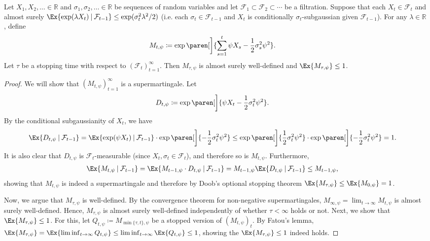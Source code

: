 \documentclass{article}
\newcommand{\defeq}{\coloneq}
\newcommand{\Real}{\mathds{R}}
\newcommand\given[1][\delimsize]{%
  \providecommand{\delimsize}{}
  \nonscript\:#1\vert\allowbreak\nonscript\:\mathopen{}
}
\DeclarePairedDelimiter{\paren}()
\begin{document}
\begin{lemma}\label{lemma:martingale-mgf}
  Let $X_1, X_2, \dotsc \in \Real$ and
  $\sigma_1, \sigma_2, \dotsc \in \Real$ be sequences of random
  variables and let
  $\mathcal{F}_1 \subset \mathcal{F}_2 \subset \dotsb$ be a
  filtration.  Suppose that each $X_t \in \mathcal{F}_t$ and almost
  surely
  $\Ex{\exp(\lambda X_t)\given \mathcal{F}_{t-1}} \le
  \exp(\sigma_t^2\lambda^2/2)$ (i.e. each
  $\sigma_t \in \mathcal{F}_{t-1}$ and $X_t$ is conditionally
  $\sigma_t$-subgaussian given $\mathcal{F}_{t-1}$).  For any
  $\lambda\in\Real$, define
  \begin{align*}
    M_{t,\psi} &\defeq \exp\paren[\bigg]{\sum_{s=1}^t \psi X_s - \frac{1}{2}\sigma_s^2\psi^2}.
  \end{align*}
  Let $\tau$ be a stopping time with respect to
  ${(\mathcal{F}_t)}_{t=1}^\infty$.  Then $M_{\tau,\psi}$ is almost surely
  well-defined and $\Ex{M_{\tau,\psi}} \le 1$.

  \begin{proof}
    We will show that ${(M_{t,\psi})}_{t=1}^\infty$ is a
    supermartingale.  Let
    \begin{align*}
      D_{t,\psi} &\defeq \exp\paren[\bigg]{\psi X_t - \frac{1}{2}\sigma_t^2\psi^2}.
    \end{align*}
    By the conditional subgaussianity of $X_t$, we have
    \begin{align*}
      \Ex{D_{t,\psi}\given\mathcal{F}_{t-1}}
      &= \Ex{\exp(\psi X_t)\given\mathcal{F}_{t-1}}
        \cdot \exp\paren[\bigg]{-\frac{1}{2}\sigma_t^2\psi^2}
      \le \exp\paren[\bigg]{\frac{1}{2}\sigma_t^2\psi^2}
        \cdot \exp\paren[\bigg]{-\frac{1}{2}\sigma_t^2\psi^2}
      = 1.
    \end{align*}
    It is also clear that $D_{t,\psi}$ is $\mathcal{F}_t$-measurable
    (since $X_t,\sigma_t \in \mathcal{F}_t$), and therefore so is
    $M_{t,\psi}$.  Furthermore,
    \begin{align*}
      \Ex{M_{t,\psi}\given\mathcal{F}_{t-1}}
      &= \Ex{M_{t-1,\psi}\cdot D_{t,\psi}\given\mathcal{F}_{t-1}}
        = M_{t-1,\psi} \Ex{D_{t,\psi}\given\mathcal{F}_{t-1}}
        \le M_{t-1,\psi},
    \end{align*}
    showing that $M_{t,\psi}$ is indeed a supermartingale and therefore
    by Doob's optional stopping theorem
    $\Ex{M_{\tau,\psi}} \le \Ex{M_{0,\psi}} = 1$.

    Now, we argue that $M_{\tau,\psi}$ is well-defined.  By the
    convergence theorem for non-negative supermartingales,
    $M_{\infty,\psi} = \lim_{t\to\infty}M_{t,\psi}$ is almost surely
    well-defined.  Hence, $M_{\tau,\psi}$ is almost surely
    well-defined independently of whether $\tau<\infty$ holds or not.
    Next, we show that $\Ex{M_{\tau,\psi}} \le 1$.  For this, let
    $Q_{t,\psi} \defeq M_{\min\{\tau,t\},\psi}$ be a stopped
    version of ${(M_{t,\psi})}_t$.  By Fatou's lemma,
    $\Ex{M_{\tau,\psi}} = \Ex{\liminf_{t\to\infty}Q_{t,\psi}} \le
    \liminf_{t\to\infty}\Ex{Q_{t,\psi}} \le 1$, showing the
    $\Ex{M_{\tau,\psi}} \le 1$ indeed holds.
  \end{proof}
\end{lemma}
\end{document}
